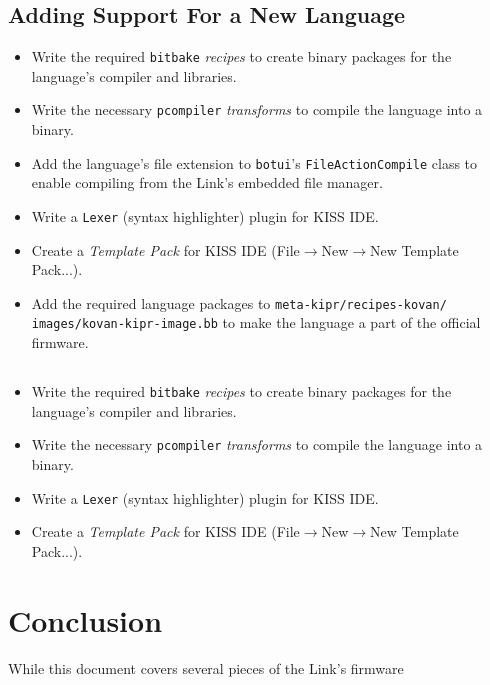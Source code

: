 \documentclass[12pt,letterpaper]{article}
\begin{document}
	\subsection{Adding Support For a New Language}
	\begin{itemize}
		\setlength{\itemsep}{0em}
		\renewcommand{\labelitemi}{$\square$} 
		\item Write the required \texttt{bitbake} \emph{recipes} to create binary packages for the language's compiler and libraries.
		\item Write the necessary \texttt{pcompiler} \emph{transforms} to compile the language into a binary.
		\item Add the language's file extension to \texttt{botui}'s \texttt{FileActionCompile} class to enable compiling from
		the Link's embedded file manager.
		\item Write a \texttt{Lexer} (syntax highlighter) plugin for KISS IDE.
		\item Create a \emph{Template Pack} for KISS IDE (File$\rightarrow$New$\rightarrow$New Template Pack...).
		\item Add the required language packages to \texttt{meta-kipr/recipes-kovan/}\\\texttt{images/kovan-kipr-image.bb} to make the language
		a part of the official firmware.
	\end{itemize}
	
	\subsection{}
	\begin{itemize}
		\setlength{\itemsep}{0em}
		\renewcommand{\labelitemi}{$\square$} 
		\item Write the required \texttt{bitbake} \emph{recipes} to create binary packages for the language's compiler and libraries.
		\item Write the necessary \texttt{pcompiler} \emph{transforms} to compile the language into a binary.
		\item Write a \texttt{Lexer} (syntax highlighter) plugin for KISS IDE.
		\item Create a \emph{Template Pack} for KISS IDE (File$\rightarrow$New$\rightarrow$New Template Pack...).
	\end{itemize}
	
	
	
	\section{Conclusion}
	While this document covers several pieces of the Link's firmware
	
\end{document}
